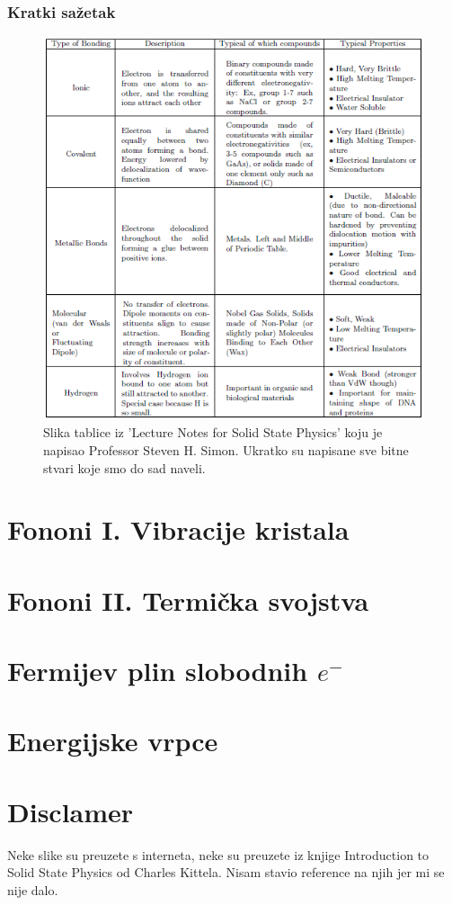 \documentclass{article}
\numberwithin{equation}{section}
\begin{document}
\subsubsection{Kratki sažetak}
\begin{figure}[h!]
    \centering
    \includegraphics[width=\linewidth]{Tablica.png}
    \caption{Slika tablice iz 'Lecture Notes for Solid State Physics' koju je napisao Professor Steven H. Simon. Ukratko su napisane sve bitne stvari koje smo do sad naveli.}
    \label{fig:TablicaSažetak}
\end{figure}
\newpage
\section{Fononi I. Vibracije kristala}

\section{Fononi II. Termička svojstva}

\section{Fermijev plin slobodnih $e^-$}

\section{Energijske vrpce}

\newpage
\section*{Disclamer}
Neke slike su preuzete s interneta, neke su preuzete iz knjige Introduction to Solid State Physics od Charles Kittela. Nisam stavio reference na njih jer mi se nije dalo.
\end{document}
